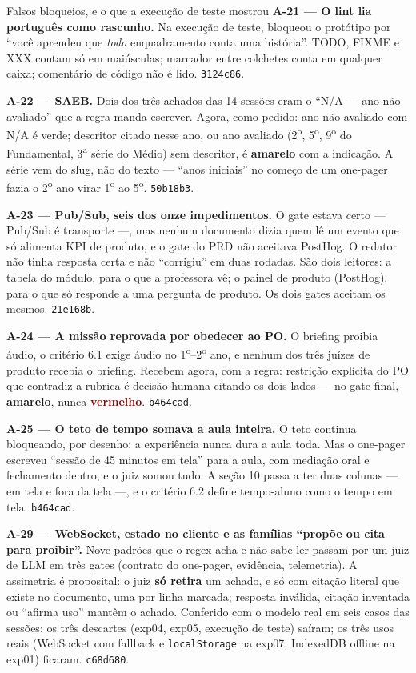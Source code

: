 \documentclass[11pt,a4paper]{article}
\newcommand{\amarelo}{\textcolor{DarkYellow}{\textbf{amarelo}}}
\newcommand{\vermelho}{\textcolor{DarkRed}{\textbf{vermelho}}}
\begin{document}
\begin{sucessobox}{Falsos bloqueios, e o que a execução de teste mostrou}
\textbf{A-21 --- O lint lia português como rascunho.} Na execução de teste, bloqueou o protótipo por ``você aprendeu que \emph{todo} enquadramento conta uma história''. TODO, FIXME e XXX contam só em maiúsculas; marcador entre colchetes conta em qualquer caixa; comentário de código não é lido. \texttt{3124c86}.

\medskip
\textbf{A-22 --- SAEB.} Dois dos três achados das 14 sessões eram o ``N/A --- ano não avaliado'' que a regra manda escrever. Agora, como pedido: ano não avaliado com N/A é verde; descritor citado nesse ano, ou ano avaliado (2\textsuperscript{o}, 5\textsuperscript{o}, 9\textsuperscript{o} do Fundamental, 3\textsuperscript{a} série do Médio) sem descritor, é \amarelo{} com a indicação. A série vem do slug, não do texto --- ``anos iniciais'' no começo de um one-pager fazia o 2\textsuperscript{o} ano virar 1\textsuperscript{o} ao 5\textsuperscript{o}. \texttt{50b18b3}.

\medskip
\textbf{A-23 --- Pub/Sub, seis dos onze impedimentos.} O gate estava certo --- Pub/Sub é transporte ---, mas nenhum documento dizia quem lê um evento que só alimenta KPI de produto, e o gate do PRD não aceitava PostHog. O redator não tinha resposta certa e não ``corrigiu'' em duas rodadas. São dois leitores: a tabela do módulo, para o que a professora vê; o painel de produto (PostHog), para o que só responde a uma pergunta de produto. Os dois gates aceitam os mesmos. \texttt{21e168b}.

\medskip
\textbf{A-24 --- A missão reprovada por obedecer ao PO.} O briefing proibia áudio, o critério 6.1 exige áudio no 1\textsuperscript{o}--2\textsuperscript{o} ano, e nenhum dos três juízes de produto recebia o briefing. Recebem agora, com a regra: restrição explícita do PO que contradiz a rubrica é decisão humana citando os dois lados --- no gate final, \amarelo{}, nunca \vermelho{}. \texttt{b464cad}.

\medskip
\textbf{A-25 --- O teto de tempo somava a aula inteira.} O teto continua bloqueando, por desenho: a experiência nunca dura a aula toda. Mas o one-pager escreveu ``sessão de 45 minutos em tela'' para a aula, com mediação oral e fechamento dentro, e o juiz somou tudo. A seção 10 passa a ter duas colunas --- em tela e fora da tela ---, e o critério 6.2 define tempo-aluno como o tempo em tela. \texttt{b464cad}.

\medskip
\textbf{A-29 --- WebSocket, estado no cliente e as famílias ``propõe ou cita para proibir''.} Nove padrões que o regex acha e não sabe ler passam por um juiz de LLM em três gates (contrato do one-pager, evidência, telemetria). A assimetria é proposital: o juiz \textbf{só retira} um achado, e só com citação literal que existe no documento, uma por linha marcada; resposta inválida, citação inventada ou ``afirma uso'' mantêm o achado. Conferido com o modelo real em seis casos das sessões: os três descartes (exp04, exp05, execução de teste) saíram; os três usos reais (WebSocket com fallback e \texttt{localStorage} na exp07, IndexedDB offline na exp01) ficaram. \texttt{c68d680}.


\end{sucessobox}
\end{document}
